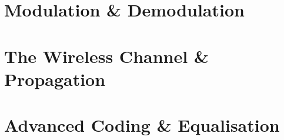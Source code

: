 \documentclass[11pt,twoside,openany]{book}
\begin{document}
\part{Modulation \& Demodulation}


\part{The Wireless Channel \& Propagation}


\part{Advanced Coding \& Equalisation}


\end{document}
